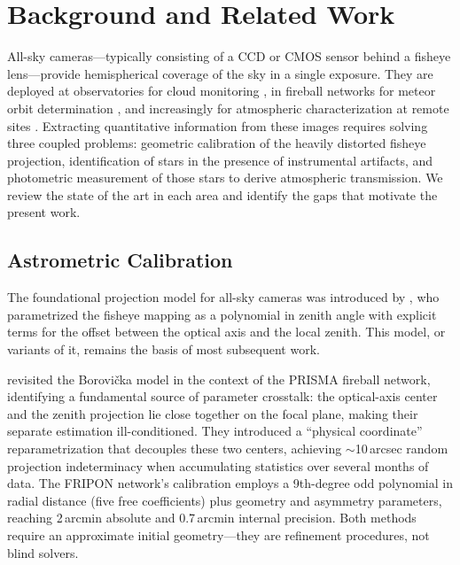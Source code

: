 \section{Background and Related Work}
\label{sec:litreview}

All-sky cameras---typically consisting of a CCD or CMOS sensor behind a
fisheye lens---provide hemispherical coverage of the sky in a single
exposure.  They are deployed at observatories for cloud monitoring
\citep{yoachim_smtn005_2016}, in fireball networks for meteor orbit
determination \citep{colas_fripon_2020, gardiol_cavezzo_2021}, and
increasingly for atmospheric characterization at remote sites
\citep{hanel_measuring_2018}.  Extracting quantitative information from
these images requires solving three coupled problems: geometric
calibration of the heavily distorted fisheye projection, identification of
stars in the presence of instrumental artifacts, and photometric
measurement of those stars to derive atmospheric transmission.  We review
the state of the art in each area and identify the gaps that motivate the
present work.

\subsection{Astrometric Calibration}
\label{sec:litreview:astrometry}

The foundational projection model for all-sky cameras was introduced by
\citet{borovicka_astrometry_1995}, who parametrized the fisheye mapping as
a polynomial in zenith angle with explicit terms for the offset between the
optical axis and the local zenith.  This model, or variants of it, remains
the basis of most subsequent work.

\citet{barghini_astrometric_2019} revisited the Borovi\v{c}ka model in the
context of the PRISMA fireball network, identifying a fundamental source of
parameter crosstalk: the optical-axis center and the zenith projection lie
close together on the focal plane, making their separate estimation
ill-conditioned.  They introduced a ``physical coordinate'' reparametrization
that decouples these two centers, achieving $\sim$10\,arcsec random
projection indeterminacy when accumulating statistics over several months of
data.  The FRIPON network's calibration \citep{jeanne_calibration_2019}
employs a 9th-degree odd polynomial in radial distance (five free
coefficients) plus geometry and asymmetry parameters, reaching 2\,arcmin
absolute and 0.7\,arcmin internal precision.  Both methods require an
approximate initial geometry---they are refinement procedures, not blind
solvers.

